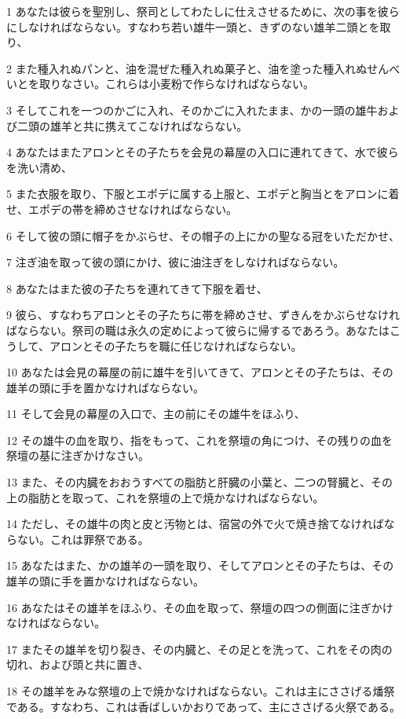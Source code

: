 \par 1 あなたは彼らを聖別し、祭司としてわたしに仕えさせるために、次の事を彼らにしなければならない。すなわち若い雄牛一頭と、きずのない雄羊二頭とを取り、
\par 2 また種入れぬパンと、油を混ぜた種入れぬ菓子と、油を塗った種入れぬせんべいとを取りなさい。これらは小麦粉で作らなければならない。
\par 3 そしてこれを一つのかごに入れ、そのかごに入れたまま、かの一頭の雄牛および二頭の雄羊と共に携えてこなければならない。
\par 4 あなたはまたアロンとその子たちを会見の幕屋の入口に連れてきて、水で彼らを洗い清め、
\par 5 また衣服を取り、下服とエポデに属する上服と、エポデと胸当とをアロンに着せ、エポデの帯を締めさせなければならない。
\par 6 そして彼の頭に帽子をかぶらせ、その帽子の上にかの聖なる冠をいただかせ、
\par 7 注ぎ油を取って彼の頭にかけ、彼に油注ぎをしなければならない。
\par 8 あなたはまた彼の子たちを連れてきて下服を着せ、
\par 9 彼ら、すなわちアロンとその子たちに帯を締めさせ、ずきんをかぶらせなければならない。祭司の職は永久の定めによって彼らに帰するであろう。あなたはこうして、アロンとその子たちを職に任じなければならない。
\par 10 あなたは会見の幕屋の前に雄牛を引いてきて、アロンとその子たちは、その雄羊の頭に手を置かなければならない。
\par 11 そして会見の幕屋の入口で、主の前にその雄牛をほふり、
\par 12 その雄牛の血を取り、指をもって、これを祭壇の角につけ、その残りの血を祭壇の基に注ぎかけなさい。
\par 13 また、その内臓をおおうすべての脂肪と肝臓の小葉と、二つの腎臓と、その上の脂肪とを取って、これを祭壇の上で焼かなければならない。
\par 14 ただし、その雄牛の肉と皮と汚物とは、宿営の外で火で焼き捨てなければならない。これは罪祭である。
\par 15 あなたはまた、かの雄羊の一頭を取り、そしてアロンとその子たちは、その雄羊の頭に手を置かなければならない。
\par 16 あなたはその雄羊をほふり、その血を取って、祭壇の四つの側面に注ぎかけなければならない。
\par 17 またその雄羊を切り裂き、その内臓と、その足とを洗って、これをその肉の切れ、および頭と共に置き、
\par 18 その雄羊をみな祭壇の上で焼かなければならない。これは主にささげる燔祭である。すなわち、これは香ばしいかおりであって、主にささげる火祭である。
